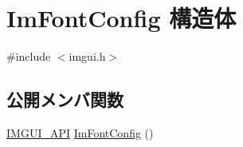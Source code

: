 \hypertarget{struct_im_font_config}{}\section{Im\+Font\+Config 構造体}
\label{struct_im_font_config}


{\ttfamily \#include $<$imgui.\+h$>$}

\subsection*{公開メンバ関数}
\begin{DoxyCompactItemize}
\item 
\mbox{\hyperlink{imgui_8h_a43829975e84e45d1149597467a14bbf5}{I\+M\+G\+U\+I\+\_\+\+A\+PI}} \mbox{\hyperlink{struct_im_font_config_af56ce39ce94ce0fb5171f4d8aa93f79c}{Im\+Font\+Config}} ()
\end{DoxyCompactItemize}
